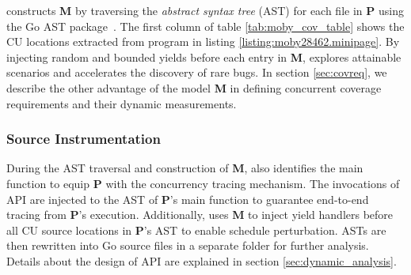 \goat constructs \textbf{M} by traversing the \textit{abstract syntax tree} (AST) for each file in \textbf{P} using the Go AST package~\cite{go-package-ast}.
%
The first column of table \ref{tab:moby_cov_table} shows the CU locations extracted from program in listing \ref{listing:moby28462.minipage}.
%
%
By injecting random and bounded yields before each entry in \textbf{M}, \goat explores attainable scenarios and accelerates the discovery of rare bugs.
%
In section \ref{sec:covreq}, we describe the other advantage of the model \textbf{M} in defining concurrent coverage requirements and their dynamic measurements.

%


\subsubsection{Source Instrumentation}
During the AST traversal and construction of \textbf{M}, \goat also identifies the main function to equip \textbf{P} with the concurrency tracing mechanism.
%
The invocations of \goat API are injected to the AST of \textbf{P}'s main function to guarantee end-to-end tracing from \textbf{P}'s execution.
%
Additionally, \goat uses \textbf{M} to inject yield handlers before all CU source locations in \textbf{P}'s AST to enable schedule perturbation.
%
ASTs are then rewritten into Go source files in a separate folder for further analysis.
%
Details about the design of \goat API are explained in section \ref{sec:dynamic_analysis}.

